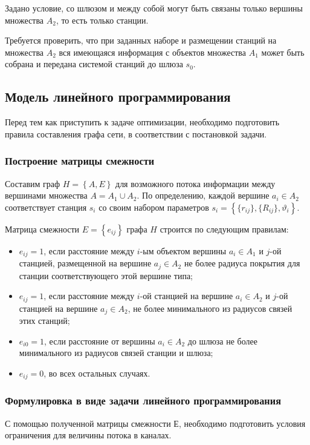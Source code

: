 Задано условие, со шлюзом и между собой могут быть связаны только вершины множества $A_2$, то есть только станции.

Требуется проверить, что при заданных наборе и размещении станций на множества $A_2$ вся имеющаяся информация с объектов множества $A_1$ может быть собрана и передана системой станций  до шлюза $s_0$.

\subsection{Модель линейного программирования}
Перед тем как приступить к задаче оптимизации, необходимо подготовить правила составления графа сети, в соответствии с постановкой задачи.

\subsubsection{Построение матрицы смежности}

Составим граф $ H = \left\{A,E \right\} $ для возможного потока информации между вершинами множества $ A = A_1 \cup A_2 $. По определению, каждой вершине $a_i \in A_2 $ соответствует станция $s_i$ со своим набором параметров $s_i = \left\{ \{r_{ij}\}, \{R_{ij}\},\vartheta_i \right\} $.

Матрица смежности $E = \left\{ e_{ij} \right\}$ графа $H$ строится по следующим правилам:

\begin{itemize}
    \item $e_{ij} = 1$, если расстояние между $i$-ым объектом вершины $a_i \in A_1$ и $j$-ой станцией, размещенной на вершине $a_j \in A_2$ не более радиуса покрытия для станции соответствующего этой вершине типа; 
    \item $e_{ij} = 1$, если расстояние между $i$-ой станцией на вершине $a_i \in A_2$ и $j$-ой станцией на вершине $a_j \in A_2$, не более минимального из радиусов связей этих станций;
    \item $e_{i0} = 1$, если расстояние от вершины $a_i \in A_2$ до шлюза не более минимального из радиусов связей станции и шлюза;
    \item $e_{ij} = 0$, во всех остальных случаях.
\end{itemize}

\subsubsection{Формулировка в виде задачи линейного программирования}
С помощью полученной матрицы смежности $Е$, необходимо подготовить условия ограничения для величины потока в каналах.

